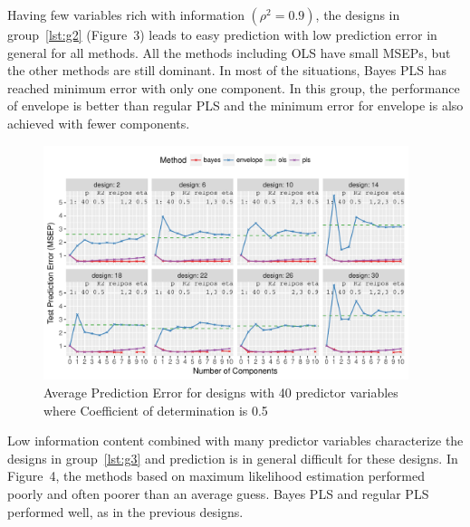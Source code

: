 \documentclass[num-refs]{wiley-article}
\begin{document}
Having few variables rich with information $(\rho^2 = 0.9)$, the designs in group~\ref{lst:g2} (Figure~3) leads to easy prediction with low prediction error in general for all methods. All the methods including OLS have small MSEPs, but the other methods are still dominant. In most of the situations, Bayes PLS has reached minimum error with only one component. In this group, the performance of envelope is better than regular PLS and the minimum error for envelope is also achieved with fewer components.


\begin{figure}[!hptb]
\centering
\includegraphics[width = 0.95\textwidth]{prediction-error-40-1.pdf}
\caption[Prediction Error - 3]{Average Prediction Error for designs with 40 predictor
variables where Coefficient of determination is 0.5}
\label{fig:pred-error-40-1}
\end{figure}

Low information content combined with many predictor variables characterize the designs in group~\ref{lst:g3} and prediction is in general difficult for these designs. In Figure~4, the methods based on maximum likelihood estimation performed poorly and often poorer than an average guess. Bayes PLS and regular PLS performed well, as in the previous designs.

\end{document}
